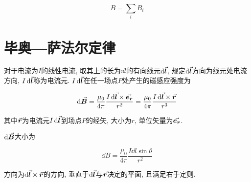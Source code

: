 \begin{equation}
	B = \sum\limits_{i} B_i \label{C8-eq2}
\end{equation}

\section{毕奥—萨法尔定律}\label{8.2}

\begin{axiom}[毕奥—萨法尔定律]
	对于电流为$I$的线性电流, 取其上的长为$\dd{l}$的有向线元$\dd{\va*{l}}$, 规定$\dd{\va*{l}}$方向为线元处电流方向, $I\dd{\va*{l}}$称为电流元. $I\dd{\va*{l}}$在任一场点$P$处产生的磁感应强度为
	
	\begin{equation}
		\dd{\va*{B}} = \dfrac{\mu_0}{4 \pi} \dfrac{I \dd{\va*{l}} \times \va*{e_r}}{r^2} = \dfrac{\mu_0}{4 \pi} \dfrac{I \dd{\va*{l}} \times \va*{r}}{r^3} \label{C8-eq3}
	\end{equation}
	
	其中$\va*{r}$为电流元$I\dd{\va*{l}}$到场点$P$的经矢, 大小为$r$, 单位矢量为$\va*{e_r}$. 
	
	$\dd{\va*{B}}$大小为
	
	\begin{equation}
		\dd{B} = \dfrac{\mu_0}{4 \pi} \dfrac{I \dd{l} \sin \theta}{r^2} \label{C8-eq4}
	\end{equation}
	
	方向为$\dd{\va*{l} \times \va*{r}}$的方向, 垂直于$\dd{\va*{l}}$与$\va*{r}$决定的平面, 且满足右手定则. 
	
\end{axiom}

